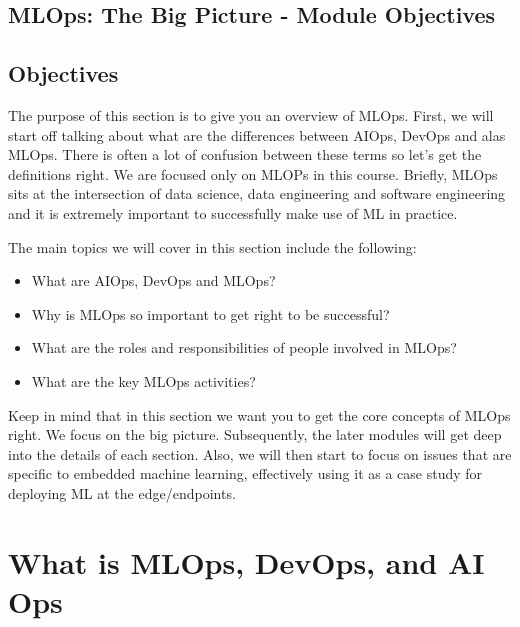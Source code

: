 \subsection{MLOps: The Big Picture - Module Objectives}


\subsection{Objectives}

The purpose of this section is to give you an overview of MLOps. First, we will start off talking about what are the differences between AIOps, DevOps and alas MLOps. There is often a lot of confusion between these terms so let’s get the definitions right. We are focused only on MLOPs in this course. Briefly, MLOps sits at the intersection of data science, data engineering and software engineering and it is extremely important to successfully make use of ML in practice.

The main topics we will cover in this section include the following:

\begin{itemize}
    \item What are AIOps, DevOps and MLOps?
    \item Why is MLOps so important to get right to be successful?
    \item What are the roles and responsibilities of people involved in MLOps?
    \item What are the key MLOps activities?
\end{itemize}


Keep in mind that in this section we want you to get the core concepts of MLOps right. We focus on the big picture. Subsequently, the later modules will get deep into the details of each section. Also, we will then start to focus on issues that are specific to embedded machine learning, effectively using it as a case study for deploying ML at the edge/endpoints.

\section{What is MLOps, DevOps, and AI Ops}

